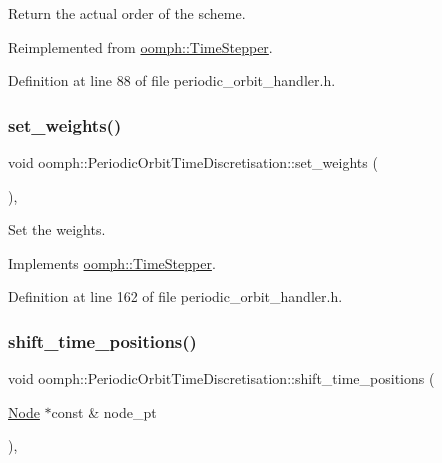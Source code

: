 Return the actual order of the scheme. 



Reimplemented from \hyperlink{classoomph_1_1TimeStepper_a251e5d4b37381e582b7cf4c554e2e724}{oomph\+::\+Time\+Stepper}.



Definition at line 88 of file periodic\+\_\+orbit\+\_\+handler.\+h.

\mbox{\label{classoomph_1_1PeriodicOrbitTimeDiscretisation_a250509cf3fb767dc65b14b8dea9ea1e8}} 
\subsubsection{\texorpdfstring{set\+\_\+weights()}{set\_weights()}}
{\footnotesize\ttfamily void oomph\+::\+Periodic\+Orbit\+Time\+Discretisation\+::set\+\_\+weights (\begin{DoxyParamCaption}{ }\end{DoxyParamCaption})\hspace{0.3cm}{\ttfamily [inline]}, {\ttfamily [virtual]}}



Set the weights. 



Implements \hyperlink{classoomph_1_1TimeStepper_a028fa3a8d3c6db6b0ddf580cb0468d55}{oomph\+::\+Time\+Stepper}.



Definition at line 162 of file periodic\+\_\+orbit\+\_\+handler.\+h.

\mbox{\label{classoomph_1_1PeriodicOrbitTimeDiscretisation_a246a40f0cfe0ebc3d5020ede92a2d0e9}} 
\subsubsection{\texorpdfstring{shift\+\_\+time\+\_\+positions()}{shift\_time\_positions()}}
{\footnotesize\ttfamily void oomph\+::\+Periodic\+Orbit\+Time\+Discretisation\+::shift\+\_\+time\+\_\+positions (\begin{DoxyParamCaption}\item[{\hyperlink{classoomph_1_1Node}{Node} $\ast$const \&}]{node\+\_\+pt }\end{DoxyParamCaption})\hspace{0.3cm}{\ttfamily [inline]}, {\ttfamily [virtual]}}




